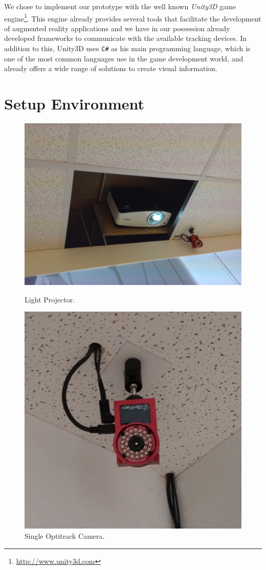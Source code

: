 We chose to implement our prototype with the well known \emph{Unity3D} game engine\footnote{\url{http://www.unity3d.com}}.
This engine already provides several tools that facilitate the development of augmented reality applications and we have in our possession already developed frameworks to communicate with the available tracking devices. In addition to this, Unity3D uses \texttt{C\#} as his main programming language, which is one of the most common languages use in the game development world, and already offers a wide range of solutions to create visual information.

\section{Setup Environment}

\begin{figure}[!t]
  \centering
  \includegraphics[width=\linewidth]{imgs/impl/projector.png}
    \caption{Light Projector.}
    \label{fig:projector}
    \endminipage\hfill
{}
  \centering
  \includegraphics[width=0.8\linewidth]{imgs/impl/optitracksensor.png}
    \caption{Single Optitrack Camera.}
    \label{fig:optitracksensor}
    \endminipage
\end{figure}

